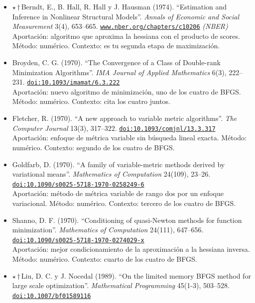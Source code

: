 \documentclass[11pt]{article}
\begin{document}
\begin{itemize}
\item $\star$\,$\dagger$\,Berndt, E., B. Hall, R. Hall y J. Hausman (1974). ``Estimation and Inference in Nonlinear Structural Models''. \textit{Annals of Economic and Social Measurement} 3(4), 653--665. \href{https://www.nber.org/chapters/c10206}{\texttt{www.nber.org/chapters/c10206}} \textit{(NBER)}\\
Aportación: algoritmo que aproxima la hessiana con el producto de scores. Método: numérico. Contexto: es tu segunda etapa de maximización.
\item Broyden, C. G. (1970). ``The Convergence of a Class of Double-rank Minimization Algorithms''. \textit{IMA Journal of Applied Mathematics} 6(3), 222--231. \href{https://doi.org/10.1093/imamat/6.3.222}{\texttt{doi:10.1093/imamat/6.3.222}}\\
Aportación: nuevo algoritmo de minimización, uno de los cuatro de BFGS. Método: numérico. Contexto: cita los cuatro juntos.
\item Fletcher, R. (1970). ``A new approach to variable metric algorithms''. \textit{The Computer Journal} 13(3), 317--322. \href{https://doi.org/10.1093/comjnl/13.3.317}{\texttt{doi:10.1093/comjnl/13.3.317}}\\
Aportación: enfoque de métrica variable sin búsqueda lineal exacta. Método: numérico. Contexto: segundo de los cuatro de BFGS.
\item Goldfarb, D. (1970). ``A family of variable-metric methods derived by variational means''. \textit{Mathematics of Computation} 24(109), 23--26. \href{https://doi.org/10.1090/s0025-5718-1970-0258249-6}{\texttt{doi:10.1090/s0025-5718-1970-0258249-6}}\\
Aportación: método de métrica variable de rango dos por un enfoque variacional. Método: numérico. Contexto: tercero de los cuatro de BFGS.
\item Shanno, D. F. (1970). ``Conditioning of quasi-Newton methods for function minimization''. \textit{Mathematics of Computation} 24(111), 647--656. \href{https://doi.org/10.1090/s0025-5718-1970-0274029-x}{\texttt{doi:10.1090/s0025-5718-1970-0274029-x}}\\
Aportación: mejor condicionamiento de la aproximación a la hessiana inversa. Método: numérico. Contexto: cuarto de los cuatro de BFGS.
\item $\star$\,$\dagger$\,Liu, D. C. y J. Nocedal (1989). ``On the limited memory BFGS method for large scale optimization''. \textit{Mathematical Programming} 45(1-3), 503--528. \href{https://doi.org/10.1007/bf01589116}{\texttt{doi:10.1007/bf01589116}}\\

\end{itemize}
\end{document}

